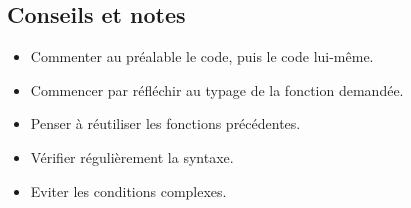 \documentclass{hibiscus}
\begin{document}
\subsection{Conseils et notes}

\begin{itemize}
\item Commenter au préalable le code, puis le code lui-même.
\item Commencer par réfléchir au typage de la fonction demandée.
\item Penser à réutiliser les fonctions précédentes.
\item Vérifier régulièrement la syntaxe.
\item Eviter les conditions complexes.
\end{itemize}
\end{document}
